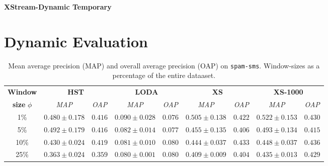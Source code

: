\documentclass[11pt,onecolumn]{article}
\begin{document}
\textbf{\huge{XStream-Dynamic Temporary}}

\section{Dynamic Evaluation}

\begin{table}[htp!]
    \centering
    \begin{tabular}{ccccccccc}
    \toprule
    \textbf{Window} & \multicolumn{2}{c}{\textbf{HST}} & \multicolumn{2}{c}{\textbf{LODA}} & \multicolumn{2}{c}{\textbf{XS}} & \multicolumn{2}{c}{\textbf{XS-1000}} \\
    \textbf{size} $\phi$ & \textit{MAP} & \textit{OAP} & \textit{MAP}& \textit{OAP}     & \textit{MAP} & \textit{OAP} & \textit{MAP} & \textit{OAP}	\\
    \midrule
    1\%  & $0.480 \pm 0.178$ & $0.416$ & $0.090 \pm 0.028$ & $0.076$ & $0.505 \pm 0.138$ & $0.422$ &	$0.522 \pm 0.153$ & $0.430$ \\
    5\% & $0.492 \pm 0.179$ & $0.416$ & $0.082 \pm 0.014$ & $0.077$ & $0.455 \pm 0.135$ & $0.406$ &$0.493 \pm 0.134$ & $0.415$	\\
    10\% & $0.430 \pm 0.024$ & $0.419$ & $0.081 \pm 0.010$ & $0.080$ & $0.444 \pm 0.037$ & $0.433$ &$0.448 \pm 0.037$ & $0.436$	\\
    25\% & $0.363 \pm 0.024$ & $0.359$ & $0.080 \pm 0.001$ & $0.080$ & $0.409 \pm 0.009$ & $0.404$ &$0.435 \pm 0.013$ & $0.429$	\\
    \bottomrule
    \end{tabular}
    \caption{Mean average precision (MAP) and overall average precision (OAP) on \texttt{spam-sms}. Window-sizes as a percentage of the entire dataaset.}
\end{table}
\end{document}

